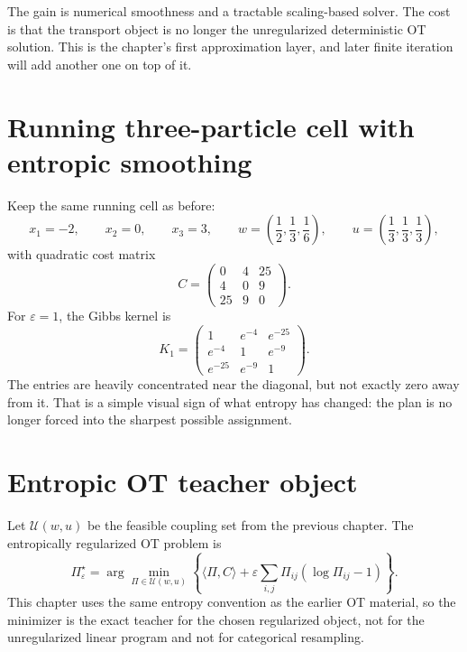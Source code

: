 The gain is numerical smoothness and a tractable scaling-based solver.  The cost is
that the transport object is no longer the unregularized deterministic OT solution.
This is the chapter's first approximation layer, and later finite iteration will add
another one on top of it.

\section{Running three-particle cell with entropic smoothing}
\label{sec:bf-eot-running-cell}

Keep the same running cell as before:
\[
  x_1=-2,
  \qquad x_2=0,
  \qquad x_3=3,
  \qquad
  w=
  \left(
    \frac{1}{2},
    \frac{1}{3},
    \frac{1}{6}
  \right),
  \qquad
  u=
  \left(
    \frac{1}{3},
    \frac{1}{3},
    \frac{1}{3}
  \right),
\]
with quadratic cost matrix
\begin{equation}
\label{eq:bf-eot-running-cost}
  C
  =
  \begin{pmatrix}
    0 & 4 & 25 \\
    4 & 0 & 9 \\
    25 & 9 & 0
  \end{pmatrix}.
\end{equation}
For \(\varepsilon=1\), the Gibbs kernel is
\begin{equation}
\label{eq:bf-eot-running-kernel}
  K_1=
  \begin{pmatrix}
    1 & e^{-4} & e^{-25} \\
    e^{-4} & 1 & e^{-9} \\
    e^{-25} & e^{-9} & 1
  \end{pmatrix}.
\end{equation}
The entries are heavily concentrated near the diagonal, but not exactly zero away
from it.  That is a simple visual sign of what entropy has changed: the plan is no
longer forced into the sharpest possible assignment.

\section{Entropic OT teacher object}
\label{sec:bf-eot-teacher-object}

Let \(\mathcal U(w,u)\) be the feasible coupling set from the previous chapter.
The entropically regularized OT problem is \citep{cuturi2013sinkhorn,peyre2019computational}
\begin{equation}
\label{eq:bf-eot-primal}
  \Pi_\varepsilon^\star
  =
  \arg\min_{\Pi\in\mathcal U(w,u)}
  \left\{
    \langle \Pi,C\rangle
    + \varepsilon\sum_{i,j}\Pi_{ij}(\log\Pi_{ij}-1)
  \right\}.
\end{equation}
This chapter uses the same entropy convention as the earlier OT material, so the
minimizer is the exact teacher for the chosen regularized object, not for the
unregularized linear program and not for categorical resampling.

